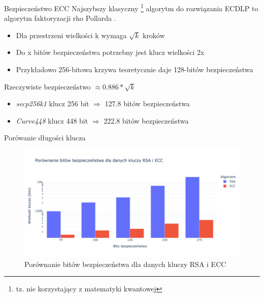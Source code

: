 \begin{frame}{Bezpieczeństwo ECC}
Najszybszy klasyczny \footnote{tz. nie korzystający z matematyki kwantowej} algorytm do rozwiązania ECDLP to algorytm faktoryzacji rho Pollarda \cite{SolvingECDLP}.
\begin{itemize}
    \item Dla przestrzeni wielkości k wymaga $\sqrt{k}$ kroków
    \item Do x bitów bezpieczeństwa potrzebny jest klucz wielkości 2x
    \item Przykładowo 256-bitowa krzywa teoretycznie daje 128-bitów bezpieczeństwa
\end{itemize}
\pause
Rzeczywiste bezpieczeństwo $\approx 0.886*\sqrt{k}$
\pause
\begin{itemize}
    \item \textit{secp256k1} klucz 256 bit $\Rightarrow$ 127.8 bitów bezpieczeństwa \cite{Secp256k1Security}
    \item \textit{Curve448} klucz 448 bit $\Rightarrow$ 222.8 bitów bezpieczeństwa \cite{Secp256k1Security}
\end{itemize}

\end{frame}

\begin{frame}{Porówanie długości klucza}
    \begin{figure}
        \centering
            \includegraphics[width=\textwidth]{security/graphics/Porównanie bitów bezpieczeństwa dla danych kluczy RSA i ECC}
            \caption{Porównanie bitów bezpieczeństwa dla danych kluczy RSA i ECC}
    \end{figure}
\end{frame}

